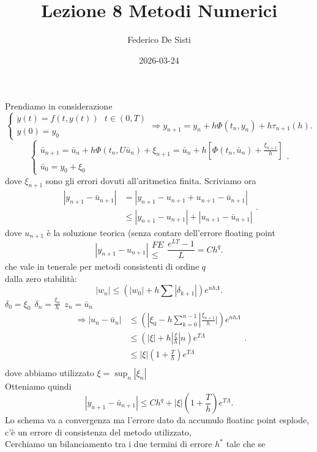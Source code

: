 \documentclass[12px]{article}
\title{Lezione 8 Metodi Numerici}
\date{2026-03-24}
\author{Federico De Sisti}
\begin{document}
	\maketitle
	\newpage
	Prendiamo in considerazione
	\[
	\begin{cases}
		\dot y(t) = f(t,y(t)) \ \ \ t\in (0,T)\\
		y(0) = y_0
	\end{cases} \Rightarrow  y_{n+1} = y_n + h\Phi(t_n,y_n) + h\tau_{n+1}(h)
	.\] 
	\[
		\begin{cases}
			\bar u_{n+1} = \bar u_n + h \Phi(t_n,U\bar u_n) + \xi_{n+1} = \bar u_n + h[\Phi(t_n,\bar u_n) + \frac {\xi_{n+1}} {h} ]\\
		\bar u_0 = y_0 + \xi_0
		\end{cases}
	.\] 
	dove $\xi_{n+1}$ sono gli errori dovuti all'aritmetica finita.
	Scriviamo ora
	\[
	\begin{split}
		|y_{n+1} - \bar u_{n+1}| &= |y_{n+1} - u_{n+1} + u_{n+1} - \bar u_{n+1}|\\
					 &\leq |y_{n+1} - u_{n+1}| + |u_{n+1} - \bar u_{n+1}|
	\end{split}
	.\] 
	dove $u_{n+1}$ è la soluzione teorica (senza contare dell'errore floating point\\
	\[
		|y_{n+1} - u_{n+1}| \substack{FE\\\leq} \frac{e^{LT}-1}L = Ch^q
	.\] 
	che vale in tenerale per metodi consistenti di ordine $q$\\ 
	dalla zero stabilità:
	\[
		|w_n|\leq (|w_0| + h \sum |\delta_{k+1}|)e^{nh\Lambda}
	.\] 
	$\delta_0 = \xi_0 \ \ \delta_n = \frac{\xi_n}{h} \ \  z_n = \bar u_n$
	\[
	\begin{split}
		\Rightarrow |u_n - \bar u_n| &\leq \left(|\xi_0 - h \sum^{n-1}_{k=0}|\frac{\xi_{n+1}}h| \right) e^{nh\Lambda}\\
					     &\leq (|\xi| + h |\frac \xi h| n)e^{T\Lambda}\\
					     &\leq |\xi| \left( 1 + \frac T h \right)e^{T\Lambda}\\
	\end{split}
	.\] 
	dove abbiamo utilizzato $\xi = \sup_n |\xi_n|$\\
	Otteniamo quindi
	\[
		|y_{n+1} - \bar u_{n+1}|\leq Ch^q + |\xi| \left(1 + \frac Th \right)e^{T\Lambda}
	.\] 
 Lo schema va a convergenza ma l'errore dato da accumulo floatinc point esplode, c'è un errore di consistenza del metodo utilizzato,\\
 Cerchiamo un bilanciamento tra i due termini di errore $h^*$ tale che se\\
\end{document}
